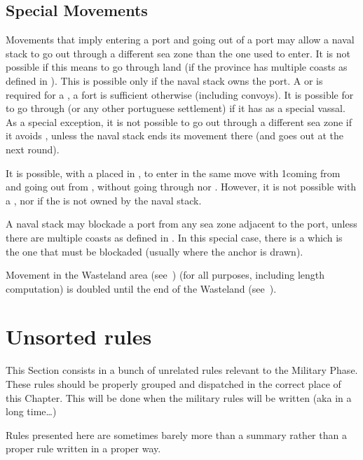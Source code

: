 \subsection{Special Movements}\label{chMilitary:Movement:Special Movements}
\label{chMilitary:Movement:Port Multiple
  Coasts} Movements that imply entering a port and going out of a port
may allow a naval stack to go out through a different sea zone than the
one used to enter.
\bparag It is not possible if this means to go through land (if the
province has multiple coasts as defined in ).
\bparag This is possible only if the naval stack owns the port. A \COL
or \TP is required for a \FLEET, a fort is sufficient otherwise
(including convoys).
\bparag[Portugal] It is possible for \SPA to go through  (or any other portuguese settlement) if it has 
as a special vassal.
 As a special exception, it is not possible to go out
through a different sea zone if it avoids , unless the
naval stack ends its movement there (and goes out at the next round).

\begin{exemple}It is possible, with a \TP placed in , to
  enter in the same move with 1\NWD coming from  and
  going out from , without going through
   nor . However, it is not
  possible with a \FLEET, nor if the \TP is not owned by the naval
  stack.
\end{exemple}

\label{chMilitary:Movement:Blockading
  Multiple Coasts} A naval stack may blockade a port from any sea zone
adjacent to the port, unless there are multiple coasts as defined in
.
\bparag In this special case, there is a  which is the
one that must be blockaded (usually where the anchor is drawn).

\aparag[Wasteland]\label{chMilitary:Movement:Wasteland} Movement in the
Wasteland area (see~) (for all purposes,
including \LoS length computation) is doubled until the end of the
Wasteland (see~).

\section{Unsorted rules}
\begin{designnote}
  This Section consists in a bunch of unrelated rules relevant to the Military
  Phase. These rules should be properly grouped and dispatched in the correct
  place of this Chapter. This will be done when the military rules will be
  written (aka in a long time\ldots)

  Rules presented here are sometimes barely more than a summary rather than a
  proper rule written in a proper way.
\end{designnote}

